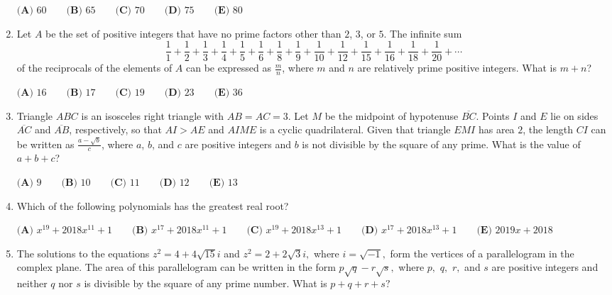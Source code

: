\documentclass{article}
\begin{document}
\begin{enumerate}[label=\arabic*., itemsep=0.5em]
$
\textbf{(A) }60 \qquad
\textbf{(B) }65 \qquad
\textbf{(C) }70 \qquad
\textbf{(D) }75 \qquad
\textbf{(E) }80 \qquad
$\par \vspace{0.5em}\item Let $A$ be the set of positive integers that have no prime factors other than $2$, $3$, or $5$. The infinite sum 
\begin{equation*}
\frac{1}{1} + \frac{1}{2} + \frac{1}{3} + \frac{1}{4} + \frac{1}{5} + \frac{1}{6} + \frac{1}{8} + \frac{1}{9} + \frac{1}{10} + \frac{1}{12} + \frac{1}{15} + \frac{1}{16} + \frac{1}{18} + \frac{1}{20} + \cdots
\end{equation*}
of the reciprocals of the elements of $A$ can be expressed as $\frac{m}{n}$, where $m$ and $n$ are relatively prime positive integers. What is $m+n$?

$\textbf{(A) } 16 \qquad \textbf{(B) } 17 \qquad \textbf{(C) } 19 \qquad \textbf{(D) } 23 \qquad \textbf{(E) } 36$\par \vspace{0.5em}\item Triangle $ABC$ is an isosceles right triangle with $AB=AC=3$. Let $M$ be the midpoint of hypotenuse $\overline{BC}$. Points $I$ and $E$ lie on sides $\overline{AC}$ and $\overline{AB}$, respectively, so that $AI>AE$ and $AIME$ is a cyclic quadrilateral. Given that triangle $EMI$ has area $2$, the length $CI$ can be written as $\frac{a-\sqrt{b}}{c}$, where $a$, $b$, and $c$ are positive integers and $b$ is not divisible by the square of any prime. What is the value of $a+b+c$?

$
\textbf{(A) }9 \qquad
\textbf{(B) }10 \qquad
\textbf{(C) }11 \qquad
\textbf{(D) }12 \qquad
\textbf{(E) }13 \qquad
$\par \vspace{0.5em}\item Which of the following polynomials has the greatest real root?

$\textbf{(A) }   x^{19}+2018x^{11}+1   \qquad        \textbf{(B) }   x^{17}+2018x^{11}+1   \qquad    \textbf{(C) }   x^{19}+2018x^{13}+1   \qquad   \textbf{(D) }  x^{17}+2018x^{13}+1 \qquad  \textbf{(E) }   2019x+2018 $\par \vspace{0.5em}\item The solutions to the equations $z^2=4+4\sqrt{15}i$ and $z^2=2+2\sqrt 3i,$ where $i=\sqrt{-1},$ form the vertices of a parallelogram in the complex plane. The area of this parallelogram can be written in the form $p\sqrt q-r\sqrt s,$ where $p,$ $q,$ $r,$ and $s$ are positive integers and neither $q$ nor $s$ is divisible by the square of any prime number. What is $p+q+r+s?$


\end{enumerate}
\end{document}
